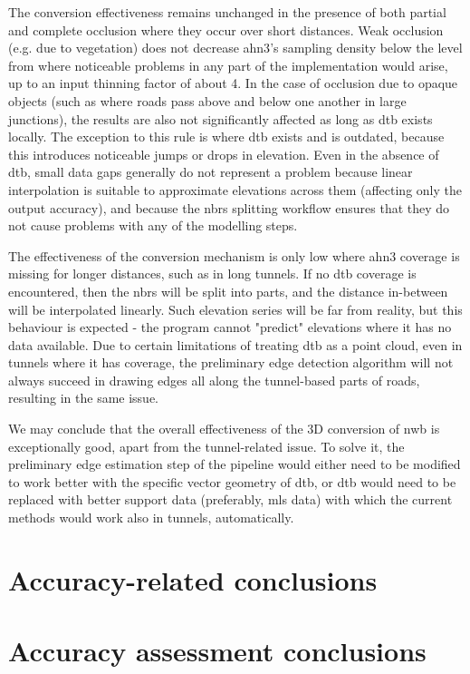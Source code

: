 The conversion effectiveness remains unchanged in the presence of both partial and complete occlusion where they occur over short distances. Weak occlusion (e.g. due to vegetation) does not decrease \ac{ahn3}'s sampling density below the level from where noticeable problems in any part of the implementation would arise, up to an input thinning factor of about 4. In the case of occlusion due to opaque objects (such as where roads pass above and below one another in large junctions), the results are also not significantly affected as long as \ac{dtb} exists locally. The exception to this rule is where \ac{dtb} exists and is outdated, because this introduces noticeable jumps or drops in elevation. Even in the absence of \ac{dtb}, small data gaps generally do not represent a problem because linear interpolation is suitable to approximate elevations across them (affecting only the output accuracy), and because the \ac{nbrs} splitting workflow ensures that they do not cause problems with any of the modelling steps.

The effectiveness of the conversion mechanism is only low where \ac{ahn3} coverage is missing for longer distances, such as in long tunnels. If no \ac{dtb} coverage is encountered, then the \ac{nbrs} will be split into parts, and the distance in-between will be interpolated linearly. Such elevation series will be far from reality, but this behaviour is expected - the program cannot "predict" elevations where it has no data available. Due to certain limitations of treating \ac{dtb} as a point cloud, even in tunnels where it has coverage, the preliminary edge detection algorithm will not always succeed in drawing edges all along the tunnel-based parts of roads, resulting in the same issue.

We may conclude that the overall effectiveness of the 3D conversion of \ac{nwb} is exceptionally good, apart from the tunnel-related issue. To solve it, the preliminary edge estimation step of the pipeline would either need to be modified to work better with the specific vector geometry of \ac{dtb}, or \ac{dtb} would need to be replaced with better support data (preferably, \ac{mls} data) with which the current methods would work also in tunnels, automatically.

\section{Accuracy-related conclusions}
\label{sec:conclusionsaccuracy}

\section{Accuracy assessment conclusions}
\label{sec:conclusionsaccuracyassessment}

